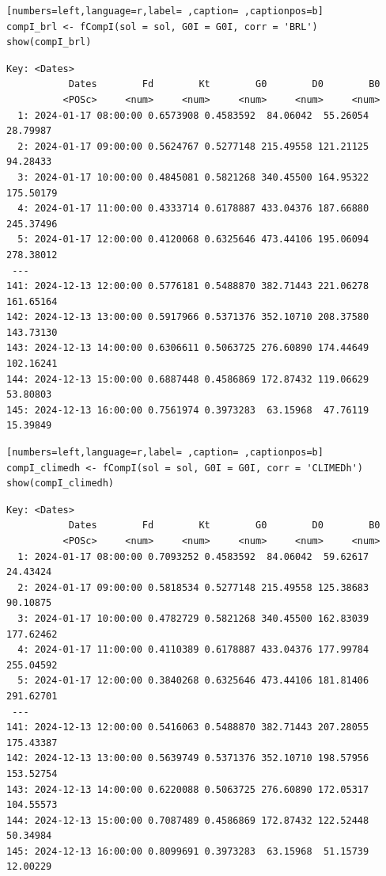 \begin{itemize}
\begin{lstlisting}[numbers=left,language=r,label= ,caption= ,captionpos=b]
compI_brl <- fCompI(sol = sol, G0I = G0I, corr = 'BRL')
show(compI_brl)
\end{lstlisting}

\begin{verbatim}
Key: <Dates>
		   Dates        Fd        Kt        G0        D0        B0
		  <POSc>     <num>     <num>     <num>     <num>     <num>
  1: 2024-01-17 08:00:00 0.6573908 0.4583592  84.06042  55.26054  28.79987
  2: 2024-01-17 09:00:00 0.5624767 0.5277148 215.49558 121.21125  94.28433
  3: 2024-01-17 10:00:00 0.4845081 0.5821268 340.45500 164.95322 175.50179
  4: 2024-01-17 11:00:00 0.4333714 0.6178887 433.04376 187.66880 245.37496
  5: 2024-01-17 12:00:00 0.4120068 0.6325646 473.44106 195.06094 278.38012
 ---                                                                      
141: 2024-12-13 12:00:00 0.5776181 0.5488870 382.71443 221.06278 161.65164
142: 2024-12-13 13:00:00 0.5917966 0.5371376 352.10710 208.37580 143.73130
143: 2024-12-13 14:00:00 0.6306611 0.5063725 276.60890 174.44649 102.16241
144: 2024-12-13 15:00:00 0.6887448 0.4586869 172.87432 119.06629  53.80803
145: 2024-12-13 16:00:00 0.7561974 0.3973283  63.15968  47.76119  15.39849
\end{verbatim}

\begin{lstlisting}[numbers=left,language=r,label= ,caption= ,captionpos=b]
compI_climedh <- fCompI(sol = sol, G0I = G0I, corr = 'CLIMEDh')
show(compI_climedh)
\end{lstlisting}

\begin{verbatim}
Key: <Dates>
		   Dates        Fd        Kt        G0        D0        B0
		  <POSc>     <num>     <num>     <num>     <num>     <num>
  1: 2024-01-17 08:00:00 0.7093252 0.4583592  84.06042  59.62617  24.43424
  2: 2024-01-17 09:00:00 0.5818534 0.5277148 215.49558 125.38683  90.10875
  3: 2024-01-17 10:00:00 0.4782729 0.5821268 340.45500 162.83039 177.62462
  4: 2024-01-17 11:00:00 0.4110389 0.6178887 433.04376 177.99784 255.04592
  5: 2024-01-17 12:00:00 0.3840268 0.6325646 473.44106 181.81406 291.62701
 ---                                                                      
141: 2024-12-13 12:00:00 0.5416063 0.5488870 382.71443 207.28055 175.43387
142: 2024-12-13 13:00:00 0.5639749 0.5371376 352.10710 198.57956 153.52754
143: 2024-12-13 14:00:00 0.6220088 0.5063725 276.60890 172.05317 104.55573
144: 2024-12-13 15:00:00 0.7087489 0.4586869 172.87432 122.52448  50.34984
145: 2024-12-13 16:00:00 0.8099691 0.3973283  63.15968  51.15739  12.00229
\end{verbatim}


\end{itemize}
